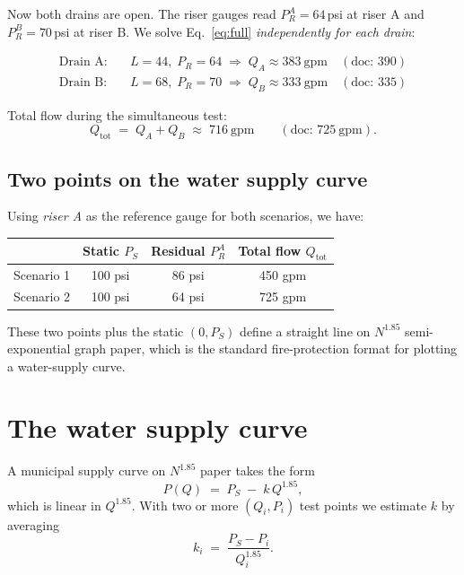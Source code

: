 \documentclass[11pt]{article}
\begin{document}
Now both drains are open. The riser gauges read $P_R^{A} = 64$\,psi at
riser A and $P_R^{B} = 70$\,psi at riser B. We solve
Eq.~\eqref{eq:full} \emph{independently for each drain}:

\begin{align*}
\text{Drain A:}\quad & L = 44, \; P_R = 64 \;\Rightarrow\; Q_A \approx 383~\text{gpm} \quad (\text{doc: } 390) \\[2pt]
\text{Drain B:}\quad & L = 68, \; P_R = 70 \;\Rightarrow\; Q_B \approx 333~\text{gpm} \quad (\text{doc: } 335)
\end{align*}

Total flow during the simultaneous test:
\[
Q_{\text{tot}} \;=\; Q_A + Q_B \;\approx\; 716~\text{gpm}
\qquad (\text{doc: } 725~\text{gpm}).
\]

\subsection*{Two points on the water supply curve}

Using \emph{riser A} as the reference gauge for both scenarios, we have:
\begin{center}
\begin{tabular}{lccc}
\toprule
 & Static $P_S$ & Residual $P_R^A$ & Total flow $Q_{\text{tot}}$ \\
\midrule
Scenario 1 & 100 psi & 86 psi & 450 gpm \\
Scenario 2 & 100 psi & 64 psi & 725 gpm \\
\bottomrule
\end{tabular}
\end{center}

These two points plus the static $(0, P_S)$ define a straight line on
$N^{1.85}$ semi-exponential graph paper, which is the standard
fire-protection format for plotting a water-supply curve.

\section{The water supply curve}

A municipal supply curve on $N^{1.85}$ paper takes the form
\begin{equation}
P(Q) \;=\; P_S \;-\; k\, Q^{1.85},
\label{eq:supply}
\end{equation}
which is linear in $Q^{1.85}$. With two or more $(Q_i, P_i)$ test points
we estimate $k$ by averaging
\[
k_i \;=\; \dfrac{P_S - P_i}{Q_i^{1.85}}.
\]
\end{document}
